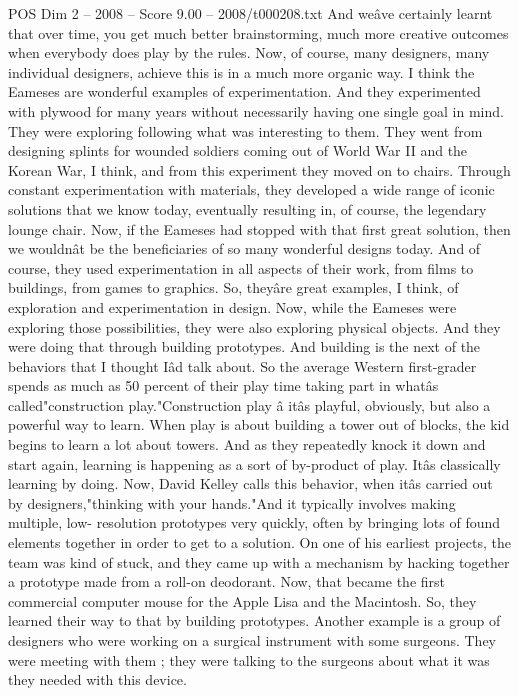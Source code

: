 \begin{textsample}{POS Dim 2 – 2008 – Score 9.00 – 2008/t000208.txt}
And weâve certainly learnt that over time, you get much better brainstorming, much more creative outcomes when everybody does play by the rules.
Now, of course, many designers, many individual designers, achieve this is in a much more organic way.
I think the Eameses are wonderful examples of experimentation.
And they experimented with plywood for many years without necessarily having one single goal in mind.
They were exploring following what was interesting to them.
They went from designing splints for wounded soldiers coming out of World War II and the Korean War, I think, and from this experiment they moved on to chairs.
Through constant experimentation with materials, they developed a wide range of iconic solutions that we know today, eventually resulting in, of course, the legendary lounge chair.
Now, if the Eameses had stopped with that first great solution, then we wouldnât be the beneficiaries of so many wonderful designs today.
And of course, they used experimentation in all aspects of their work, from films to buildings, from games to graphics.
So, theyâre great examples, I think, of exploration and experimentation in design.
Now, while the Eameses were exploring those possibilities, they were also exploring physical objects.
And they were doing that through building prototypes.
And building is the next of the behaviors that I thought Iâd talk about.
So the average Western first-grader spends as much as 50 percent of their play time taking part in whatâs called"construction play."Construction play â itâs playful, obviously, but also a powerful way to learn.
When play is about building a tower out of blocks, the kid begins to learn a lot about towers.
And as they repeatedly knock it down and start again, learning is happening as a sort of by-product of play.
Itâs classically learning by doing.
Now, David Kelley calls this behavior, when itâs carried out by designers,"thinking with your hands."And it typically involves making multiple, low- resolution prototypes very quickly, often by bringing lots of found elements together in order to get to a solution.
On one of his earliest projects, the team was kind of stuck, and they came up with a mechanism by hacking together a prototype made from a roll-on deodorant.
Now, that became the first commercial computer mouse for the Apple Lisa and the Macintosh.
So, they learned their way to that by building prototypes.
Another example is a group of designers who were working on a surgical instrument with some surgeons.
They were meeting with them ; they were talking to the surgeons about what it was they needed with this device.

\end{textsample}
